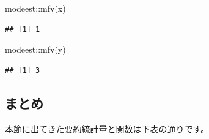 \documentclass[
  12pt,
]{book}
\newenvironment{Shaded}{\begin{snugshade}}{\end{snugshade}}
\newcommand{\FunctionTok}[1]{\textcolor[rgb]{0.00,0.00,0.00}{#1}}
\newcommand{\NormalTok}[1]{#1}
\newcommand{\SpecialCharTok}[1]{\textcolor[rgb]{0.00,0.00,0.00}{#1}}
\begin{document}
\begin{Shaded}
\begin{Highlighting}[numbers=left,,]
\NormalTok{modeest}\SpecialCharTok{::}\FunctionTok{mfv}\NormalTok{(x)}
\end{Highlighting}
\end{Shaded}

\begin{verbatim}
## [1] 1
\end{verbatim}

\begin{Shaded}
\begin{Highlighting}[numbers=left,,]
\NormalTok{modeest}\SpecialCharTok{::}\FunctionTok{mfv}\NormalTok{(y)}
\end{Highlighting}
\end{Shaded}

\begin{verbatim}
## [1] 3
\end{verbatim}

\newpage

\hypertarget{ux307eux3068ux3081}{%
\subsection{まとめ}\label{ux307eux3068ux3081}}

本節に出てきた要約統計量と関数は下表の通りです。
\end{document}
